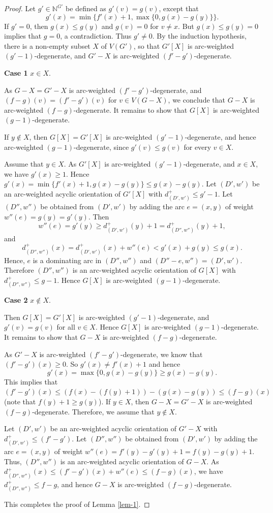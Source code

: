 \documentclass[11pt,a4paper]{article}
\theoremstyle{definition}
\begin{document}
\begin{proof}
    Let $g' \in \mathbb{N}^{G'}$ be defined as $g'(v)=g(v)$, except that $$g'(x)=\min\{f'(x)+1, \max\{0,g(x)-g(y)\}\}.$$ 
   If $g'=0$, then  $g(x) \le g(y)$ and $g(v)=0$ for $v \ne x$. But $g(x) \le g(y) = 0$ implies that $g=0$, a contradiction.
   Thus $g' \ne 0$. By the induction hypothesis,  there is a non-empty   subset $X$ of $V(G')$, so that 
$G'[X]$ is arc-weighted  $(g'-1)$-degenerate, and $G'-X$ is arc-weighted   $(f'-g')$-degenerate. 

\bigskip 
\noindent
{\bf Case 1}  $x \in X$. 



As $G-X=G'-X$ is arc-weighted   $(f'-g')$-degenerate, and $(f-g)(v)= (f'-g')(v)$ for $v \in V(G-X)$,   we conclude that  $G-X $ is arc-weighted  $(f-g)$-degenerate. 
It remains to show that $G[X]$ is arc-weighted $(g-1)$-degenerate.

If $y \notin X$, then
$G[X]=G'[X]$ is arc-weighted  $(g'-1)$-degenerate, and hence arc-weighted $(g-1)$-degenerate, since $g'(v)\le g(v)$ for every $v\in X$. 


Assume that $y \in X$.
 As $G'[X]$ is arc-weighted   $(g'-1)$-degenerate, and $x \in X$, we have   $g'(x) \ge 1$.  Hence 
$g'(x) = \min\{f'(x)+1, g(x)-g(y)\} \le g(x)-g(y)$.  Let $(D',w')$ be  an arc-weighted   acyclic orientation  of $G'[X]$ with $d_{(D',w')}^+  \le g'-1$. 
 Let $(D'',w'')$ be obtained from $(D',w')$ by adding the arc $e=(x,y)$ of weight $w''(e)= g(y)=g'(y)$. Then $$w''(e)   = g'(y)   \ge d_{(D',w')}^+(y)+1 = d_{(D'',w'')}^+(y)+1,$$
and $$d_{(D'',w'')}^+(x) = d_{(D',w')}^+(x)+w''(e) < g'(x)+g(y) \le  g(x).$$
Hence, $e$ is a dominating arc in $(D'',w'')$ and $(D''-e,w'') = (D',w')$. Therefore $(D'',w'')$ is an arc-weighted acyclic orientation of $G[X]$ with 
$ d_{(D'',w'')}^+  \le  g-1$. Hence $G[X]$ is arc-weighted   $(g-1)$-degenerate. 



\bigskip 
\noindent
{\bf Case 2}   $x \notin X$. 

Then  $G[X] = G'[X]$ is arc-weighted  $(g'-1)$-degenerate,  and $g'(v)=g(v)$ for all $v \in X$. Hence $G[X]$ is arc-weighted   $(g-1)$-degenerate. 
It remains to show that $G-X$ is arc-weighted $(f-g)$-degenerate.

As $G'-X$ is arc-weighted $(f'-g')$-degenerate,  we know that $(f'-g')(x) \ge 0$. So $g'(x) \ne f'(x)+1$ and hence $$ g'(x)= \max\{0, g(x)-g(y)\} \ge g(x)-g(y).$$ 
This implies that $(f'-g')(x) \le (f(x)-(f(y)+1)) - (g(x)-g(y)) \le (f-g)(x)$   (note that $f(y)+1 \ge g(y)$). 
If   $y \in X$,   then   $G-X = G'-X$ is arc-weighted  $(f-g)$-degenerate. 
  Therefore, we assume that $y \notin X$. 

  Let $(D',w')$ be an arc-weighted  acyclic orientation of $G'-X$ with $d_{(D',w')}^+   \le (f'-g')$.  
  Let $(D'',w'')$ be obtained from $(D',w')$ by adding the arc $e=(x,y)$ of weight $w''(e)=f'(y)-g'(y)+1=f(y)-g(y)+1$. Thus, $(D'',w'')$ is an arc-weighted   acyclic orientation of $G-X$. As $d_{(D'',w'')}^+(x)   \le (f'-g')(x) + w''(e) \le (f-g)(x)$, we have  $d_{(D'',w'')}^+  \le f-g$, and hence $G-X$ is arc-weighted   $(f-g)$-degenerate.
 
   This completes the proof of Lemma \ref{lem-1}.
		\end{proof}	
\end{document}
